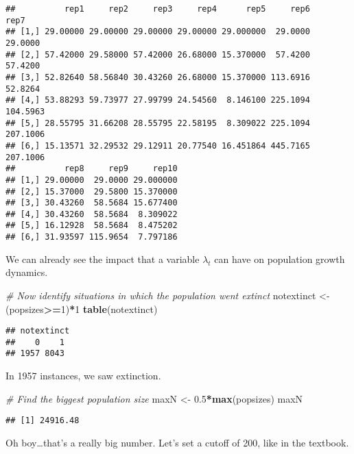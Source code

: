 \documentclass[]{article}
\newenvironment{Shaded}{\begin{snugshade}}{\end{snugshade}}
\newcommand{\KeywordTok}[1]{\textcolor[rgb]{0.13,0.29,0.53}{\textbf{#1}}}
\newcommand{\DecValTok}[1]{\textcolor[rgb]{0.00,0.00,0.81}{#1}}
\newcommand{\FloatTok}[1]{\textcolor[rgb]{0.00,0.00,0.81}{#1}}
\newcommand{\StringTok}[1]{\textcolor[rgb]{0.31,0.60,0.02}{#1}}
\newcommand{\CommentTok}[1]{\textcolor[rgb]{0.56,0.35,0.01}{\textit{#1}}}
\newcommand{\OperatorTok}[1]{\textcolor[rgb]{0.81,0.36,0.00}{\textbf{#1}}}
\newcommand{\NormalTok}[1]{#1}
\begin{document}
\begin{verbatim}
##          rep1     rep2     rep3     rep4      rep5     rep6     rep7
## [1,] 29.00000 29.00000 29.00000 29.00000 29.000000  29.0000  29.0000
## [2,] 57.42000 29.58000 57.42000 26.68000 15.370000  57.4200  57.4200
## [3,] 52.82640 58.56840 30.43260 26.68000 15.370000 113.6916  52.8264
## [4,] 53.88293 59.73977 27.99799 24.54560  8.146100 225.1094 104.5963
## [5,] 28.55795 31.66208 28.55795 22.58195  8.309022 225.1094 207.1006
## [6,] 15.13571 32.29532 29.12911 20.77540 16.451864 445.7165 207.1006
##          rep8     rep9     rep10
## [1,] 29.00000  29.0000 29.000000
## [2,] 15.37000  29.5800 15.370000
## [3,] 30.43260  58.5684 15.677400
## [4,] 30.43260  58.5684  8.309022
## [5,] 16.12928  58.5684  8.475202
## [6,] 31.93597 115.9654  7.797186
\end{verbatim}

We can already see the impact that a variable \(\lambda_t\) can have on
population growth dynamics.

\begin{Shaded}
\begin{Highlighting}[]
\CommentTok{# Now identify situations in which the population went extinct}
\NormalTok{notextinct <-}\StringTok{ }\NormalTok{(popsizes}\OperatorTok{>=}\DecValTok{1}\NormalTok{)}\OperatorTok{*}\DecValTok{1}
\KeywordTok{table}\NormalTok{(notextinct)}
\end{Highlighting}
\end{Shaded}

\begin{verbatim}
## notextinct
##    0    1 
## 1957 8043
\end{verbatim}

In 1957 instances, we saw extinction.

\begin{Shaded}
\begin{Highlighting}[]
\CommentTok{# Find the biggest population size}
\NormalTok{maxN <-}\StringTok{ }\FloatTok{0.5}\OperatorTok{*}\KeywordTok{max}\NormalTok{(popsizes)}
\NormalTok{maxN}
\end{Highlighting}
\end{Shaded}

\begin{verbatim}
## [1] 24916.48
\end{verbatim}

Oh boy\ldots{}that's a really big number. Let's set a cutoff of 200,
like in the textbook.
\end{document}
